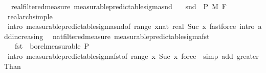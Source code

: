\begin{isabellebody}
\endisatagproof
{\isafoldproof}%
%
\isadelimproof
\isanewline
%
\endisadelimproof
\isanewline
{}\isamarkupfalse%
\ {\isacharparenleft}{\kern0pt}\ real{\isacharunderscore}{\kern0pt}filtered{\isacharunderscore}{\kern0pt}measure{\isacharparenright}{\kern0pt}\ measurable{\isacharunderscore}{\kern0pt}predictable{\isacharunderscore}{\kern0pt}sigma{\isacharunderscore}{\kern0pt}snd{\isacharcolon}{\kern0pt}\isanewline
\ \ \ {\isachardoublequoteopen}snd\ {\isasymin}\ {\isasymSigma}\isactrlsub P\ {\isasymrightarrow}\isactrlsub M\ F\ {}{\isachardoublequoteclose}\isanewline
%
\isadelimproof
\ \ %
\endisadelimproof
%
\isatagproof
{}\isamarkupfalse%
\ real{\isacharunderscore}{\kern0pt}arch{\isacharunderscore}{\kern0pt}simple\ \isamarkupfalse%
\ {\isacharparenleft}{\kern0pt}intro\ measurable{\isacharunderscore}{\kern0pt}predictable{\isacharunderscore}{\kern0pt}sigma{\isacharunderscore}{\kern0pt}snd{\isacharbrackleft}{\kern0pt}of\ {\isachardoublequoteopen}range\ {\isacharparenleft}{\kern0pt}{\isasymlambda}x{\isacharcolon}{\kern0pt}{\isacharcolon}{\kern0pt}nat{\isachardot}{\kern0pt}\ {\isacharbraceleft}{\kern0pt}{}{\isacharless}{\kern0pt}{\isachardot}{\kern0pt}{\isachardot}{\kern0pt}real\ {\isacharparenleft}{\kern0pt}Suc\ x{\isacharparenright}{\kern0pt}{\isacharbraceright}{\kern0pt}{\isacharparenright}{\kern0pt}{\isachardoublequoteclose}{\isacharbrackright}{\kern0pt}{\isacharparenright}{\kern0pt}\ {\isacharparenleft}{\kern0pt}fastforce\ intro{\isacharcolon}{\kern0pt}\ add{\isacharunderscore}{\kern0pt}increasing{\isacharparenright}{\kern0pt}{\isacharplus}{\kern0pt}%
\endisatagproof
{\isafoldproof}%
%
\isadelimproof
\isanewline
%
\endisadelimproof
\isanewline
{}\isamarkupfalse%
\ {\isacharparenleft}{\kern0pt}\ nat{\isacharunderscore}{\kern0pt}filtered{\isacharunderscore}{\kern0pt}measure{\isacharparenright}{\kern0pt}\ measurable{\isacharunderscore}{\kern0pt}predictable{\isacharunderscore}{\kern0pt}sigma{\isacharunderscore}{\kern0pt}fst{\isacharcolon}{\kern0pt}\isanewline
\ \ \ {\isachardoublequoteopen}fst\ {\isasymin}\ borel{\isacharunderscore}{\kern0pt}measurable\ {\isasymSigma}\isactrlsub P{\isachardoublequoteclose}\isanewline
%
\isadelimproof
\ \ %
\endisadelimproof
%
\isatagproof
{}\isamarkupfalse%
\ {\isacharparenleft}{\kern0pt}intro\ measurable{\isacharunderscore}{\kern0pt}predictable{\isacharunderscore}{\kern0pt}sigma{\isacharunderscore}{\kern0pt}fst{\isacharbrackleft}{\kern0pt}of\ {\isachardoublequoteopen}range\ {\isacharparenleft}{\kern0pt}{\isasymlambda}x{\isachardot}{\kern0pt}\ {\isacharbraceleft}{\kern0pt}Suc\ x{\isacharbraceright}{\kern0pt}{\isacharparenright}{\kern0pt}{\isachardoublequoteclose}{\isacharbrackright}{\kern0pt}{\isacharparenright}{\kern0pt}\ {\isacharparenleft}{\kern0pt}force\ {\isacharbar}{\kern0pt}\ simp\ add{\isacharcolon}{\kern0pt}\ greaterThan{\isacharunderscore}{\kern0pt}{}{\isacharparenright}{\kern0pt}{\isacharplus}{\kern0pt}%

\end{isabellebody}
